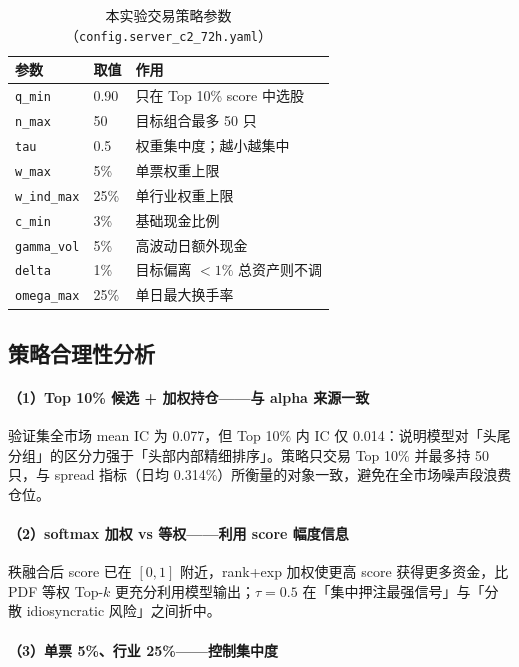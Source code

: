 \documentclass[UTF8,a4paper,12pt]{ctexart}
\begin{document}
\begin{table}[H]
\centering
\caption{本实验交易策略参数（\texttt{config.server\_c2\_72h.yaml}）}
\label{tab:strategy}
\begin{tabular}{llp{5.2cm}}
\toprule
\textbf{参数} & \textbf{取值} & \textbf{作用} \\
\midrule
\texttt{q\_min} & 0.90 & 只在 Top 10\% score 中选股 \\
\texttt{n\_max} & 50 & 目标组合最多 50 只 \\
\texttt{tau} & 0.5 & 权重集中度；越小越集中 \\
\texttt{w\_max} & 5\% & 单票权重上限 \\
\texttt{w\_ind\_max} & 25\% & 单行业权重上限 \\
\texttt{c\_min} & 3\% & 基础现金比例 \\
\texttt{gamma\_vol} & 5\% & 高波动日额外现金 \\
\texttt{delta} & 1\% & 目标偏离 $<1\%$ 总资产则不调 \\
\texttt{omega\_max} & 25\% & 单日最大换手率 \\
\bottomrule
\end{tabular}
\end{table}

\subsection{策略合理性分析}

\paragraph{（1）Top 10\% 候选 + 加权持仓——与 alpha 来源一致}

验证集全市场 mean IC 为 0.077，但 Top 10\% 内 IC 仅 0.014：说明模型对「头尾分组」的区分力强于「头部内部精细排序」。策略只交易 Top 10\% 并最多持 50 只，与 spread 指标（日均 0.314\%）所衡量的对象一致，避免在全市场噪声段浪费仓位。

\paragraph{（2）softmax 加权 vs 等权——利用 score 幅度信息}

秩融合后 score 已在 $[0,1]$ 附近，rank+exp 加权使更高 score 获得更多资金，比 PDF 等权 Top-$k$ 更充分利用模型输出；$\tau=0.5$ 在「集中押注最强信号」与「分散 idiosyncratic 风险」之间折中。

\paragraph{（3）单票 5\%、行业 25\%——控制集中度}
\end{document}
